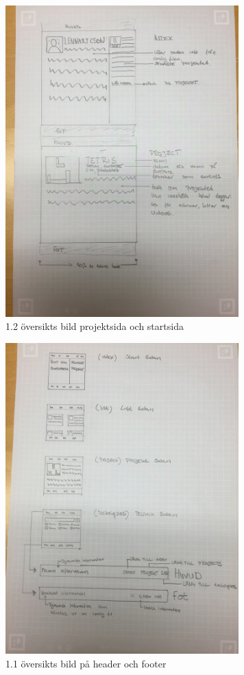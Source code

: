 \documentclass{TDP003mall}
\begin{document}
\begin{figure}[ht!]
\centering
\includegraphics[width=90mm]{IMG_0065.jpg}
\caption{1.2 översikts bild projektsida och startsida} \label{start_pro}
\end{figure}

\begin{figure}[ht!]
\centering
\includegraphics[width=90mm]{IMG_0062.jpg}
\caption{1.1 översikts bild på header och footer} \label{oversight}
\end{figure}
\end{document}
